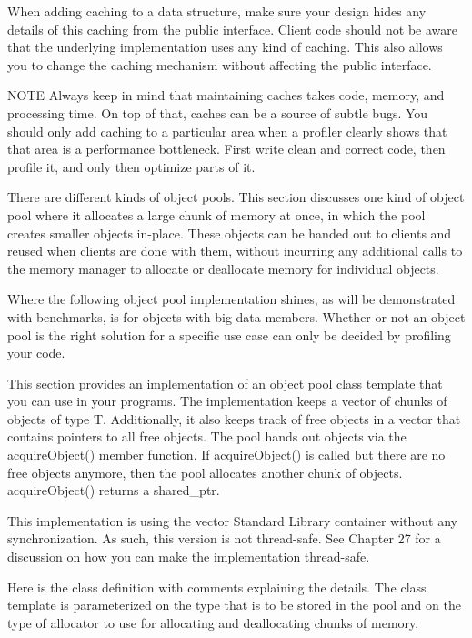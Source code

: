 When adding caching to a data structure, make sure your design hides any details of this caching from the public interface. Client code should not be aware that the underlying implementation uses any kind of caching. This also allows you to change the caching mechanism without affecting the public interface.

\begin{myNotic}{NOTE}
Always keep in mind that maintaining caches takes code, memory, and processing time. On top of that, caches can be a source of subtle bugs. You should only add caching to a particular area when a profiler clearly shows that that area is a performance bottleneck. First write clean and correct code, then profile it, and only then optimize parts of it.
\end{myNotic}


There are different kinds of object pools. This section discusses one kind of object pool where it allocates a large chunk of memory at once, in which the pool creates smaller objects in-place. These objects can be handed out to clients and reused when clients are done with them, without incurring any additional calls to the memory manager to allocate or deallocate memory for individual objects.

Where the following object pool implementation shines, as will be demonstrated with benchmarks, is for objects with big data members. Whether or not an object pool is the right solution for a specific use case can only be decided by profiling your code.


This section provides an implementation of an object pool class template that you can use in your programs. The implementation keeps a vector of chunks of objects of type T. Additionally, it also keeps track of free objects in a vector that contains pointers to all free objects. The pool hands out objects via the acquireObject() member function. If acquireObject() is called but there are no free objects anymore, then the pool allocates another chunk of objects. acquireObject() returns a shared\_ptr.

This implementation is using the vector Standard Library container without any synchronization. As such, this version is not thread-safe. See Chapter 27 for a discussion on how you can make the implementation thread-safe.

Here is the class definition with comments explaining the details. The class template is parameterized on the type that is to be stored in the pool and on the type of allocator to use for allocating and deallocating chunks of memory.

